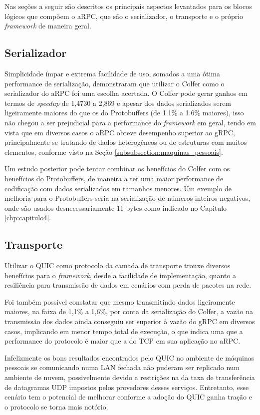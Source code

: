Nas seções a seguir são descritos os principais aspectos levantados para os blocos lógicos que compõem o aRPC, que são o serializador, o transporte e o próprio \textit{framework} de maneira geral.

\subsection{Serializador}

Simplicidade ímpar e extrema facilidade de uso, somados a uma ótima performance de serialização, demonstraram que utilizar o Colfer como o serializador do aRPC foi uma escolha acertada. O Colfer pode gerar ganhos em termos de \textit{speedup} de 1,4730 a 2,869 e apesar dos dados serializados serem ligeiramente maiores do que os do Protobuffers (de 1.1\% a 1.6\% maiores), isso não chegou a ser prejudicial para a performance do \textit{framework} em geral, tendo em vista que em diversos casos o aRPC obteve desempenho superior ao gRPC, principalmente se tratando de dados heterogêneos ou de estruturas com muitos elementos, conforme visto na Seção \ref{subsubsection:maquinas_pessoais}.

Um estudo posterior pode tentar combinar os benefícios do Colfer com os benefícios do Protobuffers, de maneira a ter uma maior performance de codificação com dados serializados em tamanhos menores. Um exemplo de melhoria para o Protobuffers seria na serialização de números inteiros negativos, onde são usados desnecessariamente 11 bytes como indicado no Capitulo \ref{chp:capitulo4}.

\subsection{Transporte}

Utilizar o QUIC como protocolo da camada de transporte trouxe diversos benefícios para o \textit{framework}, desde a facilidade de implementação, quanto a resiliência para transmissão de dados em cenários com perda de pacotes na rede.

Foi também possível constatar que mesmo transmitindo dados ligeiramente maiores, na faixa de 1,1\% a 1,6\%, por conta da serialização do Colfer, a vazão na transmissão dos dados ainda conseguiu ser superior à vazão do gRPC em diversos casos, implicando em menor tempo total de execução, o que indica uma que a performance do protocolo é maior que a do TCP em sua aplicação no aRPC.

Infelizmente os bons resultados encontrados pelo QUIC no ambiente de máquinas pessoais se comunicando numa LAN fechada não puderam ser replicado num ambiente de nuvem, possivelmente devido a restrições na da taxa de transferência de datagramas UDP impostos pelos provedores desses serviços. Entretanto, esse cenário tem o potencial de melhorar conforme a adoção do QUIC ganha tração e o protocolo se torna mais notório.

